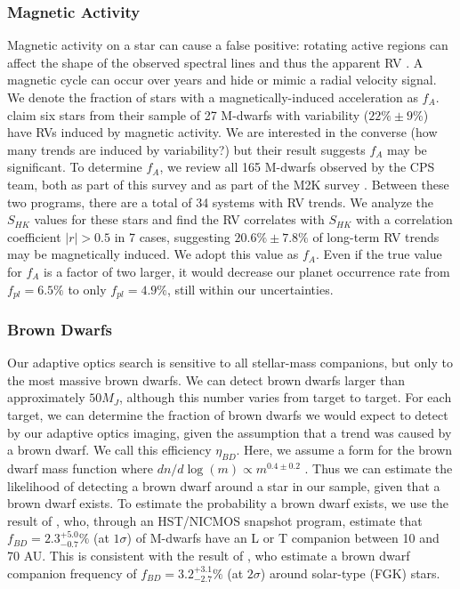 \subsubsection{Magnetic Activity}
\label{MA}
Magnetic activity on a star can cause a false positive: rotating active regions can affect the shape of the observed spectral lines and thus the apparent RV \citep{Gray88}. A magnetic cycle can occur over years and hide or mimic a radial velocity signal. We denote the fraction of stars with a magnetically-induced acceleration as $f_A$. \citet{GomesdaSilva12} claim six stars from their sample of 27 M-dwarfs with variability ($22\% \pm 9\%$) have RVs induced by magnetic activity. We are interested in the converse (how many trends are induced by variability?) but their result suggests $f_A$ may be significant. To determine $f_A$, we review all 165 M-dwarfs observed by the CPS team, both as part of this survey and as part of the M2K survey \citep{Apps10, Fischer12}. Between these two programs, there are a total of 34 systems with RV trends. We analyze the $S_{HK}$ values for these stars and find the RV correlates with $S_{HK}$ with a correlation coefficient $|r| > 0.5$ in 7 cases, suggesting $20.6\% \pm 7.8\%$ of long-term RV trends may be magnetically induced. We adopt this value as $f_A$. Even if the true value for $f_A$ is a factor of two larger, it would decrease our planet occurrence rate from $f_{pl} = 6.5\%$ to only $f_{pl} = 4.9\%$, still within our uncertainties.

\subsubsection{Brown Dwarfs}
\label{BD}
Our adaptive optics search is sensitive to all stellar-mass companions, but only to the most massive brown dwarfs. We can detect brown dwarfs larger than approximately $50 M_J$, although this number varies from target to target. For each target, we can determine the fraction of brown dwarfs we would expect to detect by our adaptive optics imaging, given the assumption that a trend was caused by a brown dwarf. We call this efficiency $\eta_{BD}$. Here, we assume a form for the brown dwarf mass function where $dn/d\log(m) \propto m^{0.4 \pm 0.2}$ \citep{Pena-Ramirez12}. Thus we can estimate the likelihood of detecting a brown dwarf around a star in our sample, given that a brown dwarf exists. To estimate the probability a brown dwarf exists, we use the result of \citet{Dieterich12}, who, through an HST/NICMOS snapshot program, estimate that $f_{BD} = 2.3^{+5.0}_{-0.7}\%$ (at $1\sigma$) of M-dwarfs have an L or T companion between 10 and 70 AU. This is consistent with the result of \citet{Metchev09}, who estimate a brown dwarf companion frequency of $f_{BD} = 3.2^{+3.1}_{-2.7}\%$ (at $2\sigma$) around solar-type (FGK) stars.

